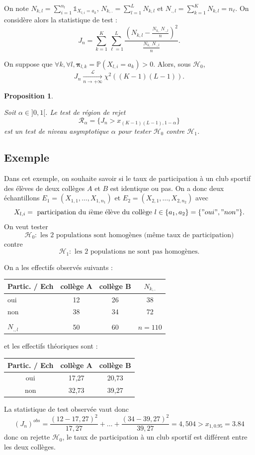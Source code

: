 \documentclass[
]{book}
\newtheorem{proposition}{Proposition}[chapter]
\theoremstyle{definition}
\theoremstyle{definition}
\theoremstyle{definition}
\theoremstyle{definition}
\theoremstyle{remark}
\begin{document}
On note \(N_{k,l} = \sum_{i=1}^{n_l} \mathbb{1}_{X_{l,i} = a_k}\), \(N_{k,.}= \sum_{l=1}^{L} N_{k,l}\) et \(N_{.,l}=\sum_{k=1}^K N_{k,l}=n_\ell\).
On considère alors la statistique de test :
\[
J_n =  \sum_{k=1}^K \sum_{\ell=1}^L \frac{\left(N_{k,l}    -  \frac{N_{k,.} N_{.,l}}{n}   \right)^2}{ \frac{N_{k,.} N_{.,l}}{n} }. 
\]

On suppose que \(\forall k,\forall l, \boldsymbol{\pi}_{l,k}=\mathbb{P}(X_{l,i}=a_k)>0\). Alors, sous \(\mathcal{H}_0\),
\[
J_n \underset{n\rightarrow +\infty}{\stackrel{\mathcal L}{\longrightarrow}}\chi^2((K-1)(L-1)).
\]

\begin{proposition}
\protect\hypertarget{prp:unlabeled-div-49}{}\label{prp:unlabeled-div-49}

Soit \(\alpha\in]0,1[\). Le test de région de rejet
\[
\mathcal R_\alpha = \{ J_n > x_{(K-1)(L-1),1-\alpha} \}
\]
est un test de niveau asymptotique \(\alpha\) pour tester \(\mathcal{H}_0\) contre \(\mathcal{H}_1\).

\end{proposition}

\hypertarget{exemple-2}{%
\subsection{Exemple}\label{exemple-2}}

Dans cet exemple, on souhaite savoir si le taux de participation à un club sportif des élèves de deux collèges \(A\) et \(B\) est identique ou pas.
On a donc deux échantillons \(E_1=(X_{1,1},\ldots,X_{1,n_1})\) et \(E_2=(X_{2,1},\ldots,X_{2,n_2})\) avec
\[
X_{l,i}= \textrm{ participation du } i \textrm{ème élève du collège } l \in \{a_1,a_2\}=\{"oui","non"\}.
\]
On veut tester
\[
\mathcal{H}_0 : \textrm{ les 2 populations sont homogènes (même taux de participation)}
\]
contre
\[
\mathcal{H}_1 : \textrm{ les 2 populations ne sont pas homogènes}.
\]

On a les effectifs observés suivants :

\begin{longtable}[]{@{}lccc@{}}
\toprule
Partic. / Ech & collège A & collège B & \(N_{k,.}\)\tabularnewline
\midrule
\endhead
oui & 12 & 26 & 38\tabularnewline
non & 38 & 34 & 72\tabularnewline
& & &\tabularnewline
\(N_{.,l}\) & 50 & 60 & \(n=110\)\tabularnewline
\bottomrule
\end{longtable}

et les effectifs théoriques sont :

\begin{longtable}[]{@{}ccc@{}}
\toprule
Partic. / Ech & collège A & collège B\tabularnewline
\midrule
\endhead
oui & 17,27 & 20,73\tabularnewline
non & 32,73 & 39,27\tabularnewline
\bottomrule
\end{longtable}

La statistique de test observée vaut donc
\[(J_n)^{obs} = \frac{(12-17,27)^2}{17,27} + \ldots + \frac{(34-39,27)^2}{39,27}=4,504 > x_{1,0.95}=3.84\]
donc on rejette \(\mathcal{H}_0\), le taux de participation à un club sportif est différent entre les deux collèges.

  
\end{document}
